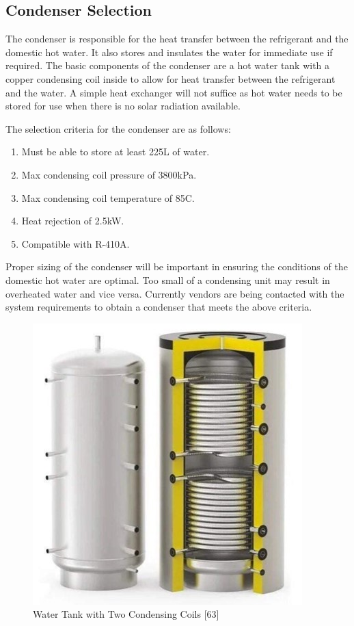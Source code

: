 \subsection{Condenser Selection}

The condenser is responsible for the heat transfer between the refrigerant and the domestic hot water. It also stores and insulates the water for immediate use if required. The basic components of the condenser are a hot water tank with a copper condensing coil inside to allow for heat transfer between the refrigerant and the water. A simple heat exchanger will not suffice as hot water needs to be stored for use when there is no solar radiation available.

\medskip
The selection criteria for the condenser are as follows:

\medskip
\begin{enumerate}[itemsep=3mm, parsep=-1mm, label=\roman*.]
    \item Must be able to store at least 225L of water.
    \item Max condensing coil pressure of 3800kPa.
    \item Max condensing coil temperature of 85\textdegree C.
    \item Heat rejection of 2.5kW.
    \item Compatible with R-410A.
\end{enumerate}

\medskip
Proper sizing of the condenser will be important in ensuring the conditions of the domestic hot water are optimal. Too small of a condensing unit may result in overheated water and vice versa. Currently vendors are being contacted with the system requirements to obtain a condenser that meets the above criteria.

\medskip
\begin{figure}[H]
    \centering
    \includegraphics[width=6 cm]{images/water_tank_condenser.jpg}
    \caption{Water Tank with Two Condensing Coils [63]}
\end{figure}

